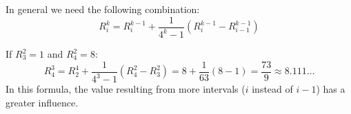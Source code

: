 \begin{example}
\begin{center}
    \end{center}
\end{example}

In general we need the following combination:
\[
    R_i^k = R_i^{k-1} + \frac{1}{4^k - 1} (R_i^{k-1} - R_{i-1}^{k-1})
\]

\begin{example}
    If $R_3^2 = 1$ and $R_4^2 = 8$:
    \[
        R_4^3 = R_2^4 + \frac{1}{4^3 - 1} (R_4^2 - R_3^2) =
        8 + \frac{1}{63} (8 - 1) = \frac{73}{9} \approx 8.111\dots
    \]
    In this formula, the value resulting from more intervals ($i$ instead of $i-1$)
    has a greater influence.
\end{example}

